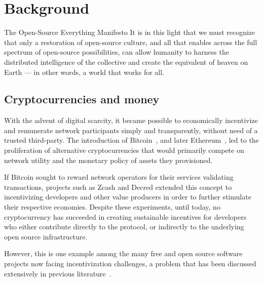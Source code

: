 \section{Background}

\begin{epigraph}{The Open-Source Everything Manifesto}
    \noindent It is in this light that we must recognize that only a restoration of
    open-source culture, and all that enables across the full spectrum of
    open-source possibilities, can allow humanity to harness the distributed
    intelligence of the collective and create the equivalent of heaven on Earth
    --- in other words, a world that works for all.
\end{epigraph}

\subsection{Cryptocurrencies and money}

With the advent of digital scarcity, it became possible to economically
incentivize and remunerate network participants simply and transparently,
without need of a trusted third-party. The introduction of
Bitcoin~\cite{bitcoin}, and later Ethereum~\cite{ethereum}, led to the
proliferation of alternative cryptocurrencies that would primarily compete on
network utility and the monetary policy of assets they provisioned.


If Bitcoin sought to reward network operators for their services validating
transactions, projects such as Zcash and Decred extended this concept to
incentivizing developers and other value producers in order to further stimulate
their respective economies. Despite these experiments, until today, no cryptocurrency
has succeeded in creating sustainable incentives for developers who either
contribute directly to the protocol, or indirectly to the underlying open source
infrastructure.

However, this is one example among the many free and open source software projects
now facing incentivization challenges, a problem that has been
discussed extensively in previous literature~\cite{roads and bridges}.

